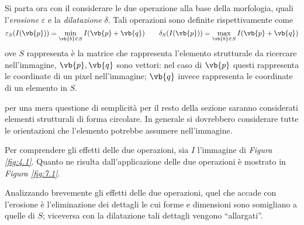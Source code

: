 \documentclass{subfiles}
\begin{document}
Si parta ora con il considerare le due operazione alla base della morfologia, quali l'\emph{erosione} \(\varepsilon\) e la \emph{dilatazione} \(\delta\).
Tali operazioni sono definite rispettivamente come
\[
    \varepsilon_{S}(I(\vb{p})) = \min\limits_{\vb{b} \in S}{I(\vb{p} + \vb{q})} \qquad \delta_{S}(I(\vb{p})) = \max\limits_{\vb{b} \in S}{I(\vb{p} + \vb{q})}
\]
ove \(S\) rappresenta è la matrice che rappresenta l'elemento strutturale da ricercare nell'immagine,
\(\vb{p}, \vb{q}\) sono vettori: nel caso di \(\vb{p}\) questi rappresenta le coordinate di un pixel nell'immagine;
\(\vb{q}\) invece rappresenta le coordinate di un elemento in \(S\).

\begin{Note*}
    per una mera questione di semplicità per il resto della sezione saranno considerati elementi strutturali di forma circolare.
    In generale si dovrebbero considerare tutte le orientazioni che l'elemento potrebbe assumere nell'immagine.
\end{Note*}

Per comprendere gli effetti delle due operazioni, sia \(I\) l'immagine di \emph{Figura \ref{fig:4.1}}.
Quanto ne risulta dall'applicazione delle due operazioni è mostrato in \emph{Figura \ref{fig:7.1}}.


Analizzando brevemente gli effetti delle due operazioni, quel che accade con l'erosione è l'eliminazione dei dettagli le cui forme e dimensioni sono somigliano a quelle di \(S\);
viceversa con la dilatazione tali dettagli vengono ``allargati''.
\end{document}
